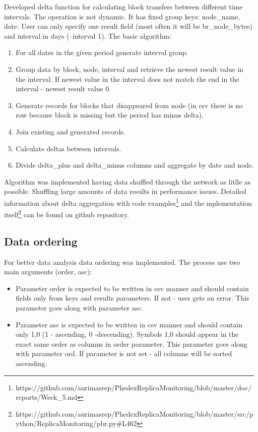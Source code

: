 Developed delta function for calculating block transfers between different time intervals. The operation is not dynamic. It has fixed group keys: node{\_}name, 
date. User can only specify one result field (most often it will be br{\_}node{\_}bytes) and interval in days (--interval 1). The basic algorithm:
\begin{enumerate}
\item For all dates in the given period generate interval group.
\item Group data by block, node, interval and retrieve the newest result value in the interval. If newest value in the interval does not match the end in the interval 
- newest result value 0.
\item Generate records for blocks that disappeared from node (in csv there is no row because block is missing but the period has minus delta).
\item Join existing and generated records.
\item Calculate deltas between intervals.
\item Divide delta{\_}plus and delta{\_}minus columns and aggregate by date and node.
\end{enumerate}
Algorithm was implemented having data shuffled through the network as litlle as possible. Shuffling large amounts of data results in performance issues. Detailed 
information about delta aggregation with code examples\footnote{https://github.com/aurimasrep/PhedexReplicaMonitoring/blob/master/doc/reports/Week{\_}5.md} and the 
mplementation itself\footnote{https://github.com/aurimasrep/PhedexReplicaMonitoring/blob/master/src/python/ReplicaMonitoring/pbr.py\#L462} can be found on github repository.

\subsection{Data ordering}

For better data analysis data ordering was implemented. The process use two main arguments (order, asc):
\begin{itemize}
\item Parameter order is expected to be written in csv manner and should contain fields only from keys and results parameters. If not - user gets an error. This 
parameter goes along with parameter asc.
\item Parameter asc is expected to be written in csv manner and should contain only 1,0 (1 - ascending, 0 -descending). Symbols 1,0 should appear in the exact same 
order as columns in order parameter. This parameter goes along with parameter ord. If parameter is not set - all columns will be sorted ascending.
\end{itemize}

